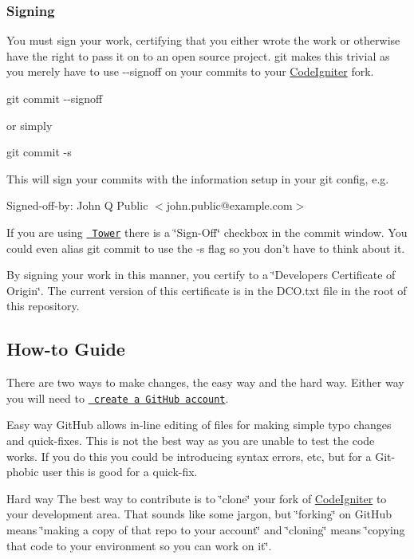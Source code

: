 \subsubsection*{Signing}

You must sign your work, certifying that you either wrote the work or otherwise have the right to pass it on to an open source project. git makes this trivial as you merely have to use {\ttfamily -\/-\/signoff} on your commits to your \mbox{\hyperlink{namespace_code_igniter}{Code\+Igniter}} fork.

{\ttfamily git commit -\/-\/signoff}

or simply

{\ttfamily git commit -\/s}

This will sign your commits with the information setup in your git config, e.\+g.

{\ttfamily Signed-\/off-\/by\+: John Q Public $<$john.\+public@example.\+com$>$}

If you are using \href{http://www.git-tower.com/}{\texttt{ Tower}} there is a \char`\"{}\+Sign-\/\+Off\char`\"{} checkbox in the commit window. You could even alias git commit to use the {\ttfamily -\/s} flag so you don’t have to think about it.

By signing your work in this manner, you certify to a \char`\"{}\+Developer\textquotesingle{}s Certificate of Origin\char`\"{}. The current version of this certificate is in the {\ttfamily D\+C\+O.\+txt} file in the root of this repository.

\subsection*{How-\/to Guide}

There are two ways to make changes, the easy way and the hard way. Either way you will need to \href{https://github.com/signup/free}{\texttt{ create a Git\+Hub account}}.

Easy way Git\+Hub allows in-\/line editing of files for making simple typo changes and quick-\/fixes. This is not the best way as you are unable to test the code works. If you do this you could be introducing syntax errors, etc, but for a Git-\/phobic user this is good for a quick-\/fix.

Hard way The best way to contribute is to \char`\"{}clone\char`\"{} your fork of \mbox{\hyperlink{namespace_code_igniter}{Code\+Igniter}} to your development area. That sounds like some jargon, but \char`\"{}forking\char`\"{} on Git\+Hub means \char`\"{}making a copy of that repo to your account\char`\"{} and \char`\"{}cloning\char`\"{} means \char`\"{}copying that code to your environment so you can work on it\char`\"{}.


